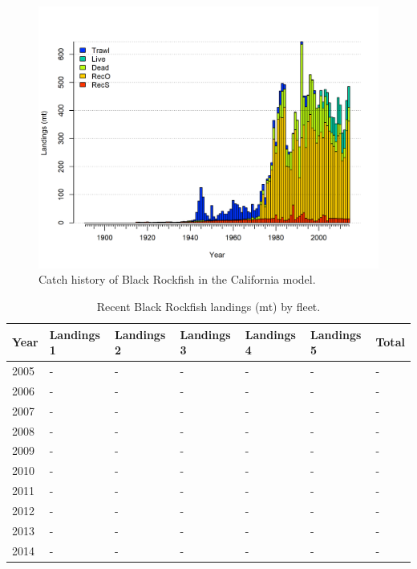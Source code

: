 \documentclass[12pt,]{article}
\begin{document}
\FloatBarrier

\begin{figure}[htbp]
\centering
\includegraphics{r4ss/plots_mod2/catch2 landings stacked.png}
\caption{Catch history of Black Rockfish in the California model.
\label{fig:r4ss_catches2}}
\end{figure}

\begin{table}[ht]
\centering
\caption{Recent Black Rockfish landings (mt) by 
                                            fleet.} 
\label{tab:Exec_catch}
\begin{tabular}{l>{\centering}p{1in}>{\centering}p{1in}>{\centering}p{1in}>{\centering}p{.9in}>{\centering}p{.9in}>{\centering}p{.6in}}
  \hline
Year & Landings 1 & Landings 2 & Landings 3 & Landings 4 & Landings 5 & Total \\ 
  \hline
2005 & - & - & - & - & - & - \\ 
  2006 & - & - & - & - & - & - \\ 
  2007 & - & - & - & - & - & - \\ 
  2008 & - & - & - & - & - & - \\ 
  2009 & - & - & - & - & - & - \\ 
  2010 & - & - & - & - & - & - \\ 
  2011 & - & - & - & - & - & - \\ 
  2012 & - & - & - & - & - & - \\ 
  2013 & - & - & - & - & - & - \\ 
  2014 & - & - & - & - & - & - \\ 
   \hline
\end{tabular}
\end{table}
\end{document}
